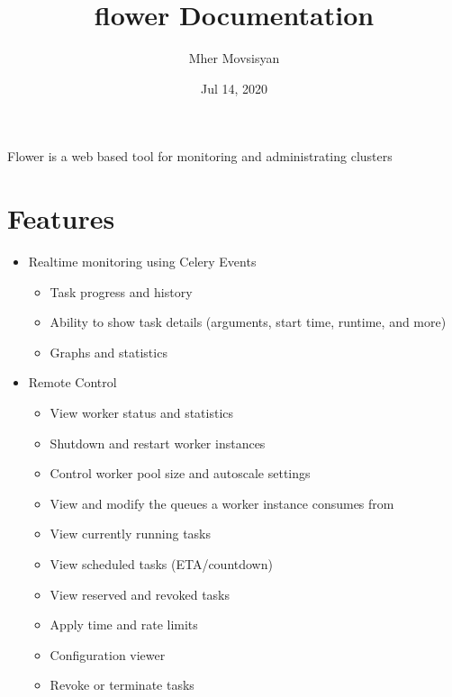 \documentclass[letterpaper,10pt,english]{sphinxmanual}
\title{flower Documentation}
\date{Jul 14, 2020}
\author{Mher Movsisyan}
\begin{document}
\pagestyle{empty}
\sphinxmaketitle
\pagestyle{plain}
\sphinxtableofcontents
\pagestyle{normal}
\label{\detokenize{index::doc}}


Flower is a web based tool for monitoring and administrating  clusters


\chapter{Features}
\label{\detokenize{index:features}}\begin{itemize}
\item {} 
Real\sphinxhyphen{}time monitoring using Celery Events
\begin{itemize}
\item {} 
Task progress and history

\item {} 
Ability to show task details (arguments, start time, runtime, and more)

\item {} 
Graphs and statistics

\end{itemize}

\item {} 
Remote Control
\begin{itemize}
\item {} 
View worker status and statistics

\item {} 
Shutdown and restart worker instances

\item {} 
Control worker pool size and autoscale settings

\item {} 
View and modify the queues a worker instance consumes from

\item {} 
View currently running tasks

\item {} 
View scheduled tasks (ETA/countdown)

\item {} 
View reserved and revoked tasks

\item {} 
Apply time and rate limits

\item {} 
Configuration viewer

\item {} 
Revoke or terminate tasks


\end{itemize}
\end{itemize}
\end{document}
